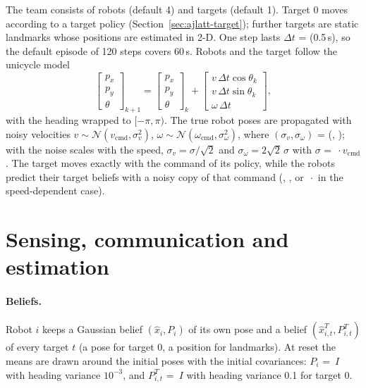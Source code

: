 The team consists of  robots (default 4) and
 targets (default 1). Target 0 moves according to a target
policy (Section~\ref{sec:ajlatt-target}); further targets are static landmarks
whose positions are estimated in 2-D. One step lasts $\Delta t$ =
 (0.5\,s), so the default episode of 120 steps covers
60\,s. Robots and the target follow the unicycle model
\begin{equation}
  \begin{bmatrix} p_x \\ p_y \\ \theta \end{bmatrix}_{k+1}
  = \begin{bmatrix} p_x \\ p_y \\ \theta \end{bmatrix}_{k}
  + \begin{bmatrix} v\,\Delta t \cos\theta_k \\ v\,\Delta t \sin\theta_k \\ \omega\,\Delta t \end{bmatrix},
  \label{eq:ajlatt-unicycle}
\end{equation}
with the heading wrapped to $[-\pi, \pi)$. The true robot poses are propagated
with noisy velocities $v \sim \mathcal{N}(v_{\mathrm{cmd}}, \sigma_v^2)$,
$\omega \sim \mathcal{N}(\omega_{\mathrm{cmd}}, \sigma_\omega^2)$, where
$(\sigma_v, \sigma_\omega)$ = (, ); with
 the noise scales with the speed,
$\sigma_v = \sigma/\sqrt{2}$ and $\sigma_\omega = 2\sqrt{2}\,\sigma$ with
$\sigma$ = $\,\cdot v_{\mathrm{cmd}}$. The target moves exactly
with the command of its policy, while the robots predict their target beliefs
with a noisy copy of that command (, , or
$\,\cdot$ in the speed-dependent
case).

\section{Sensing, communication and estimation}\label{sec:ajlatt-estimation}

\paragraph{Beliefs.} Robot $i$ keeps a Gaussian belief
$(\hat x_i, P_i)$ of its own pose and a belief
$(\hat x^{T}_{i,t}, P^{T}_{i,t})$ of every target $t$ (a pose for target 0, a
position for landmarks). At reset the means are drawn around the initial poses
with the initial covariances: $P_i$ = $\,I$ with
heading variance $10^{-3}$, and $P^T_{i,t}$ = $\,I$
with heading variance 0.1 for target 0.

